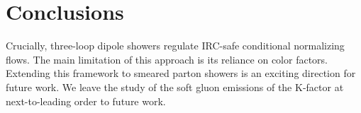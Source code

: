 \section{Conclusions}\label{sec:conclusions}

Crucially, three-loop dipole showers regulate IRC-safe conditional
normalizing flows. The main limitation of this approach is its reliance
on color factors. Extending this framework to smeared parton showers is
an exciting direction for future work. We leave the study of the soft
gluon emissions of the K-factor at next-to-leading order to future work.

